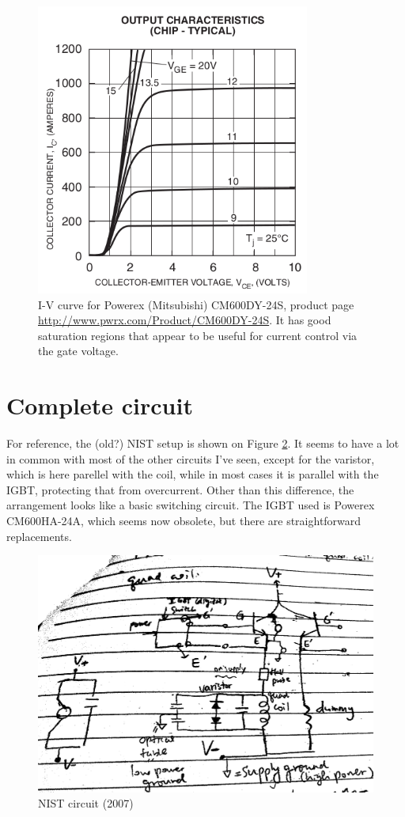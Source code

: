 \documentclass[12pt,a4paper]{article}
\begin{document}
\begin{figure}[ht!]
\centering
\includegraphics[width=90mm]{CM600DY-24S_I_V.png}
\caption{I-V curve for Powerex (Mitsubishi) CM600DY-24S, product page \url{http://www.pwrx.com/Product/CM600DY-24S}. It has good saturation regions that appear to be useful for current control via the gate voltage.}
\label{fig:cm600dy}
\end{figure}

\section{Complete circuit}

For reference, the (old?) NIST setup is shown on Figure \ref{fig:nistcircuit}. It seems to have a lot in common with most of the other circuits I've seen, except for the varistor, which is here parellel with the coil, while in most cases it is parallel with the IGBT, protecting that from overcurrent. Other than this difference, the arrangement looks like a basic switching circuit. The IGBT used is Powerex CM600HA-24A, which seems now obsolete, but there are straightforward replacements.

\begin{figure}[ht!]
\centering
\includegraphics[width=120mm]{NIST.png}
\caption{NIST circuit (2007)}
\label{fig:nistcircuit}
\end{figure}
\end{document}
